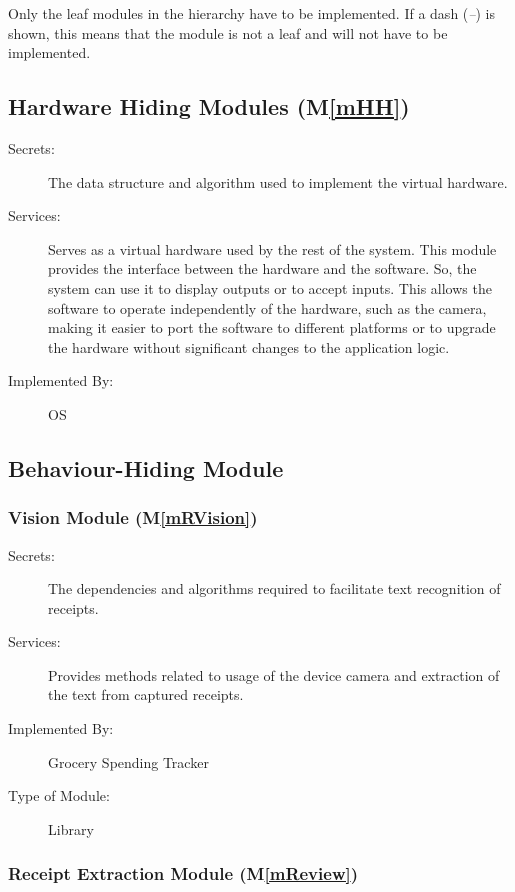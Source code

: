 \documentclass[12pt, titlepage]{article}
\newcommand{\mref}[1]{M\ref{#1}}
\begin{document}
Only the leaf modules in the hierarchy have to be implemented. If a dash
(\emph{--}) is shown, this means that the module is not a leaf and will not have
to be implemented.

\subsection{Hardware Hiding Modules (\mref{mHH})}

\begin{description}
\item[Secrets:]The data structure and algorithm used to implement the virtual
  hardware.
  \item[Services:]Serves as a virtual hardware used by the rest of the
  system. This module provides the interface between the hardware and the
  software. So, the system can use it to display outputs or to accept inputs. This allows the 
  software to operate independently of the hardware, such as the camera, making it easier to port
  the software to different platforms or to upgrade the hardware without significant changes to the application logic.
\item[Implemented By:] OS
\end{description}

\subsection{Behaviour-Hiding Module}

\subsubsection{Vision Module (\mref{mRVision})}

\begin{description}
\item[Secrets:] The dependencies and algorithms required to facilitate text recognition of receipts.
\item[Services:] Provides methods related to usage of the device camera and extraction of the text from captured
receipts.
\item[Implemented By:] Grocery Spending Tracker
\item[Type of Module:] Library
\end{description}

\subsubsection{Receipt Extraction Module (\mref{mReview})}
\end{document}
